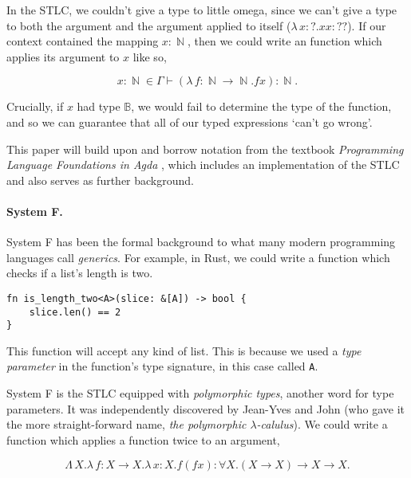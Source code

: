 \documentclass[logo,bsc,singlespacing,parskip,online]{infthesis}
\DeclareMathOperator{\nat}{\mathbb{N}}
\begin{document}
In the STLC, we couldn't give a type to little omega, since we can't give a type
to both the argument and the argument applied to itself ($\lambda \, x  \colon ?
. x x \colon ??$). If our context contained the mapping $x \colon \nat$, then we
could write an function which applies its argument to $x$ like so,

\begin{equation*}
  x \colon \nat \in \Gamma \vdash (\lambda \, f \colon \nat \to \nat . f x) \colon \nat.
\end{equation*}

Crucially, if $x$ had type $\mathbb{B}$, we would fail to determine the type of
the function, and so we can guarantee that all of our typed expressions `can't
go wrong'. \citep{milner_theory_1978}

This paper will build upon and borrow notation from the textbook
\textit{Programming Language Foundations in Agda}
\citep{wadler_programming_2022}, which includes an implementation of the STLC
and also serves as further background.

\paragraph*{System F.} System F has been the formal background to what many
modern programming languages call \textit{generics}. For example, in Rust, we
could write a function which checks if a list's length is two.

\begin{verbatim}
fn is_length_two<A>(slice: &[A]) -> bool {
    slice.len() == 2
}
\end{verbatim}

This function will accept any kind of list. This is because we used a
\textit{type parameter} in the function's type signature, in this case called
\texttt{A}.

System F is the STLC equipped with \textit{polymorphic types}, another word for
type parameters. It was independently discovered by Jean-Yves
\citet{girard_interpretation_1972} and John \citet{goos_towards_1974} (who gave
it the more straight-forward name, \textit{the polymorphic $\lambda$-calulus}).
We could write a function which applies a function twice to an argument,

\begin{equation*}
  \Lambda \, X. \lambda \, f \colon X \to X . \lambda \, x \colon X . f (f x) \colon \forall X . (X \to X) \to X \to X.
\end{equation*}
\end{document}
